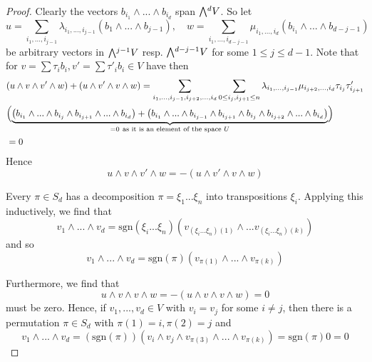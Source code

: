 \documentclass{scrartcl}
\newcommand{\sgn}{\mathrm{sgn}}
\newcommand{\extpow}{\mathchoice{{\textstyle\bigwedge}}
    {{\bigwedge}}
    {{\textstyle\wedge}}
    {{\scriptstyle\wedge}}}
\theoremstyle{definition}
\begin{document}
\begin{proof}
    Clearly the vectors $b_{i_1} \wedge ... \wedge b_{i_d}$ span $\extpow^d V$.
    So let
    \begin{equation*}
        u = \sum_{i_1, ..., i_{j - 1}} \lambda_{i_1, ..., i_{j - 1}} (b_1 \wedge ... \wedge b_{j - 1}), \quad w = \sum_{i_1, ..., i_{d - j - 1}} \mu_{i_1, ..., i_d} (b_{i_1} \wedge ... \wedge b_{d - j - 1})
    \end{equation*}
    be arbitrary vectors in $\extpow^{j - 1} V$ resp. $\extpow^{d - j - 1} V$ for some $1 \leq j \leq d - 1$.
    Note that for $v = \sum \tau_i b_i, v' = \sum \tau'_i b_i \in V$ have then
    \begin{align*}
        &(u \wedge v \wedge v' \wedge w) + (u \wedge v' \wedge v \wedge w) = \sum_{i_1, ..., i_{j - 1}, i_{j + 2}, ..., i_d} \sum_{0 \leq i_j, i_{j + 1} \leq n} \lambda_{i_1, ..., i_{j - 1}} \mu_{i_{j + 2}, ..., i_d} \tau_{i_j} \tau'_{i_{j + 1}} \\
        &\Bigl(\underbrace{\bigl( b_{i_1} \wedge ... \wedge b_{i_j} \wedge b_{i_{j + 1}} \wedge ... \wedge b_{i_d}\bigr) + \bigl( b_{i_1} \wedge ... \wedge b_{i_{j - 1}} \wedge b_{i_{j + 1}} \wedge b_{i_j} \wedge b_{i_{j + 2}} \wedge ... \wedge b_{i_d} \bigr)}_{= 0 \ \text{as it is an element of the space $U$}} \Bigl) \\
        &= 0
    \end{align*}
    Hence
    \begin{equation*}
        u \wedge v \wedge v' \wedge w = -(u \wedge v' \wedge v \wedge w)
    \end{equation*}

    Every $\pi \in S_d$ has a decomposition $\pi = \xi_1 ... \xi_n$ into transpositions $\xi_i$.
    Applying this inductively, we find that
    \begin{equation*}
        v_1 \wedge ... \wedge v_d = \sgn(\xi_i ... \xi_n) (v_{(\xi_i ... \xi_n)(1)} \wedge ... v_{(\xi_i ... \xi_n)(k)})
    \end{equation*}
    and so
    \begin{equation*}
        v_1 \wedge ... \wedge v_d = \sgn(\pi) (v_{\pi(1)} \wedge ... \wedge v_{\pi(k)})
    \end{equation*}

    Furthermore, we find that
    \begin{equation*}
        u \wedge v \wedge v \wedge w = -(u \wedge v \wedge v \wedge w) = 0
    \end{equation*}
    must be zero.
    Hence, if $v_1, ..., v_d \in V$ with $v_i = v_j$ for some $i \neq j$, then there is a permutation $\pi \in S_d$ with $\pi(1) = i, \pi(2) = j$ and
    \begin{equation*}
        v_1 \wedge ... \wedge v_d = (\sgn(\pi))(v_i \wedge v_j \wedge v_{\pi(3)} \wedge ... \wedge v_{\pi(k)}) = \sgn(\pi) 0 = 0
    \end{equation*}
\end{proof}
\end{document}
